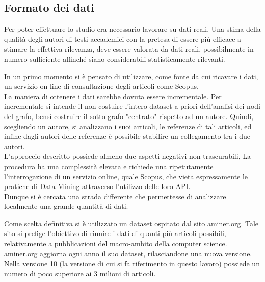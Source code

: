 \documentclass[a4paper, 12pt]{article}
\begin{document}
\subsection{Formato dei dati}
Per poter effettuare lo studio era necessario lavorare su dati reali. Una stima della qualità degli autori di testi accademici con la pretesa di essere più efficace a stimare la effettiva rilevanza, deve essere valorata da dati reali, possibilmente in numero sufficiente affinché siano considerabili statisticamente rilevanti.
\par
In un primo momento si è pensato di utilizzare, come fonte da cui ricavare i dati, un servizio on-line di consultazione degli articoli come Scopus. \\ 
La maniera di ottenere i dati sarebbe dovuta essere incrementale.
Per incrementale si intende il non costuire l'intero dataset a priori dell'analisi dei nodi del grafo, bensì costruire il sotto-grafo "centrato" rispetto ad un autore.
Quindi, scegliendo un autore, si analizzano i suoi articoli, le referenze di tali articoli, ed infine dagli autori delle referenze è possibile stabilire un collegamento tra i due autori. \\
L'approccio descritto possiede almeno due aspetti negativi non trascurabili,
La procedura ha una complessità elevata e richiede una ripetutamente l'interrogazione di un servizio online, quale Scopus, che vieta espressamente le pratiche di Data Mining attraverso l'utilizzo delle loro API. \\
Dunque si è cercata una strada differente che permettesse di analizzare localmente una grande quantità di dati.
\par
Come scelta definitiva si è utilizzato un dataset ospitato dal sito aminer.org. Tale sito si prefige l'obiettivo di riunire i dati di quanti più articoli possibili, relativamente a pubblicazioni del macro-ambito della computer science. \\
aminer.org aggiorna ogni anno il suo dataset, rilasciandone una nuova versione. Nella versione 10 (la versione di cui si fa riferimento in questo lavoro) possiede un numero di poco superiore ai 3 milioni di articoli. \\
\end{document}
